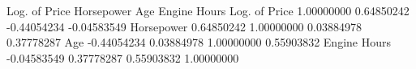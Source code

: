               Log. of Price Horsepower         Age Engine Hours
Log. of Price    1.00000000 0.64850242 -0.44054234  -0.04583549
Horsepower       0.64850242 1.00000000  0.03884978   0.37778287
Age             -0.44054234 0.03884978  1.00000000   0.55903832
Engine Hours    -0.04583549 0.37778287  0.55903832   1.00000000
